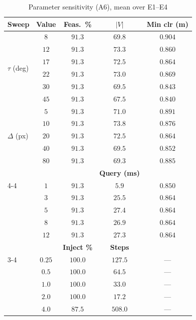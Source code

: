 \documentclass[conference]{IEEEtran}
\begin{document}
\begin{table}[htbp]
\caption{Parameter sensitivity (A6), mean over E1--E4}
\label{tab:sweep}
\begin{center}
\begin{tabular}{@{}lcccc@{}}
\toprule
\textbf{Sweep} & \textbf{Value} & \textbf{Feas.\ \%} & \textbf{$|V|$} & \textbf{Min clr (m)} \\ \midrule
\multirow{6}{*}{$\tau$ (deg)}
& $8$  & $91.3$ & $69.8$ & $0.904$ \\
& $12$ & $91.3$ & $73.3$ & $0.860$ \\
& $17$ & $91.3$ & $72.5$ & $0.864$ \\
& $22$ & $91.3$ & $73.0$ & $0.869$ \\
& $30$ & $91.3$ & $69.5$ & $0.843$ \\
& $45$ & $91.3$ & $67.5$ & $0.840$ \\ \midrule
\multirow{5}{*}{$\Delta$ (px)}
& $5$  & $91.3$ & $71.0$ & $0.891$ \\
& $10$ & $91.3$ & $73.8$ & $0.876$ \\
& $20$ & $91.3$ & $72.5$ & $0.864$ \\
& $40$ & $91.3$ & $69.5$ & $0.852$ \\
& $80$ & $91.3$ & $69.3$ & $0.885$ \\ \midrule
& & & \textbf{Query (ms)} & \\ \cmidrule(l){4-4}
\multirow{5}{*}{$K$}
& $1$  & $91.3$ & $5.9$  & $0.850$ \\
& $3$  & $91.3$ & $25.5$ & $0.864$ \\
& $5$  & $91.3$ & $27.4$ & $0.864$ \\
& $8$  & $91.3$ & $26.9$ & $0.864$ \\
& $12$ & $91.3$ & $27.3$ & $0.864$ \\ \midrule
& & \textbf{Inject \%} & \textbf{Steps} & \\ \cmidrule(l){3-4}
\multirow{5}{*}{$\alpha$ (px)}
& $0.25$ & $100.0$ & $127.5$ & --- \\
& $0.5$  & $100.0$ & $64.5$  & --- \\
& $1.0$  & $100.0$ & $33.0$  & --- \\
& $2.0$  & $100.0$ & $17.2$  & --- \\
& $4.0$  & $87.5$  & $508.0$ & --- \\ \bottomrule
\end{tabular}
\end{center}
\end{table}

\end{document}
